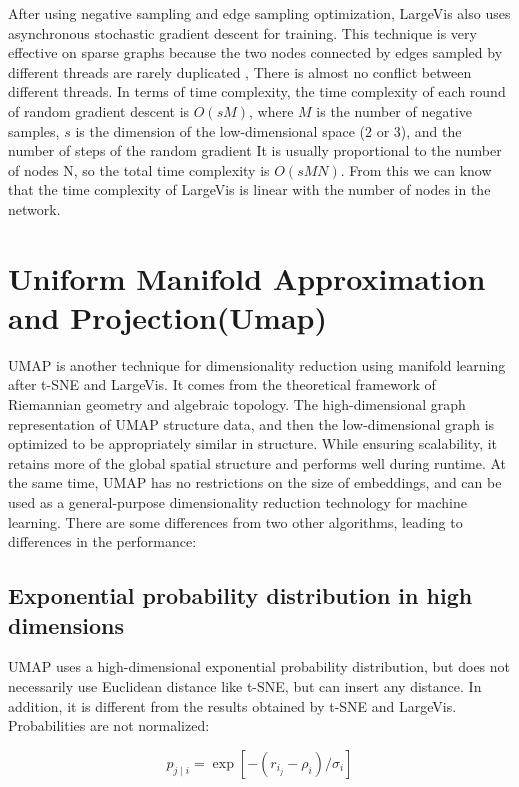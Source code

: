 \noindent After using negative sampling and edge sampling optimization, LargeVis also uses asynchronous stochastic gradient descent for training. This technique is very effective on sparse graphs because the two nodes connected by edges sampled by different threads are rarely duplicated , There is almost no conflict between different threads. In terms of time complexity, the time complexity of each round of random gradient descent is $O(sM)$, where $M$ is the number of negative samples, $s$ is the dimension of the low-dimensional space (2 or 3), and the number of steps of the random gradient It is usually proportional to the number of nodes N, so the total time complexity is $O(sMN)$. From this we can know that the time complexity of LargeVis is linear with the number of nodes in the network.

\chapter{Uniform Manifold Approximation and Projection(Umap)}

UMAP is another technique for dimensionality reduction using manifold learning after t-SNE and LargeVis. It comes from the theoretical framework of Riemannian geometry and algebraic topology. The high-dimensional graph representation of UMAP structure data, and then the low-dimensional graph is optimized to be appropriately similar in structure.  While ensuring scalability, it retains more of the global spatial structure and performs well during runtime. At the same time, UMAP has no restrictions on the size of embeddings, and can be used as a general-purpose dimensionality reduction technology for machine learning. There are some differences from two other algorithms, leading to differences in the performance:\\

\section{Exponential probability distribution in high dimensions}

UMAP uses a high-dimensional exponential probability distribution, but does not necessarily use Euclidean distance like t-SNE, but can insert any distance. In addition, it is different from the results obtained by t-SNE and LargeVis. Probabilities are not normalized:

\begin{equation*}
    {p_{j\mid i}} = \exp {[−(r_i_j− \rho_i)/\sigma_i]} 
\end{equation*}

